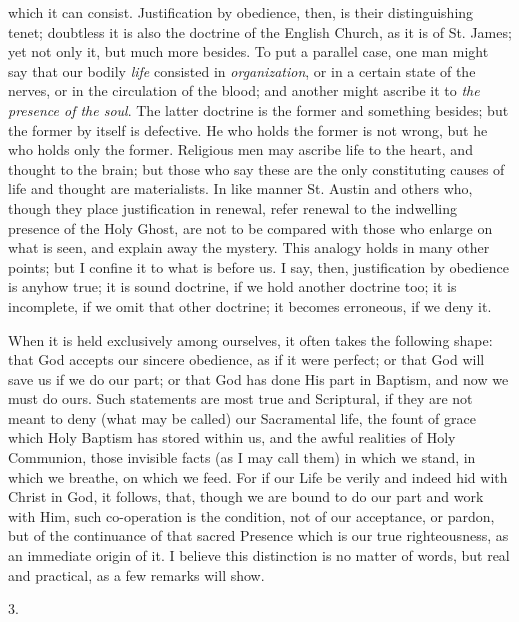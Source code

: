 which it can consist. Justification by obedience, then, is their
distinguishing tenet; doubtless it is also the doctrine of the English
Church, as it is of St. James; yet not only it, but much more besides.
To put a parallel case, one man might say that our bodily \emph{life}
consisted in \emph{organization}, or in a certain state of the nerves,
or in the circulation of the blood; and another might ascribe it to \emph{the
presence of the soul}. The latter doctrine is the former and
something besides; but the former by itself is defective. He who
holds the former is not wrong, but he who holds only the former.
Religious men may ascribe life to the heart, and thought to the brain;
but those who say these are the only constituting causes of life and
thought are materialists. In like manner St. Austin and others who,
though they place justification in renewal, refer renewal to the
indwelling presence of the Holy Ghost, are not to be compared with
those who enlarge on what is seen, and explain away the mystery. This
analogy holds in many other points; but I confine it to what is before
us. I say, then, justification by obedience is anyhow true; it is
sound doctrine, if we hold another doctrine too; it is incomplete, if
we omit that other doctrine; it becomes erroneous, if we deny it.

When it is held exclusively among ourselves, it often takes the
following shape: that God accepts our sincere obedience, as if it were
perfect; or that God will save us if we do our part; or that God has
done His part in Baptism, and now we must do ours. Such statements are
most true and Scriptural, if they are not meant to deny (what may be
called) our Sacramental life, the fount of grace which Holy Baptism
has stored within us, and the awful realities of Holy Communion, those
invisible facts (as I may call them) in which we stand, in which we
breathe, on which we feed. For if our Life be verily and indeed hid
with Christ in God, it follows, that, though we are bound to do our
part and work with Him, such co-operation is the condition, not of our
acceptance, or pardon, but of the continuance of that sacred Presence
which is our true righteousness, as an immediate origin of it. I
believe this distinction is no matter of words, but real and
practical, as a few remarks will show.

3.

